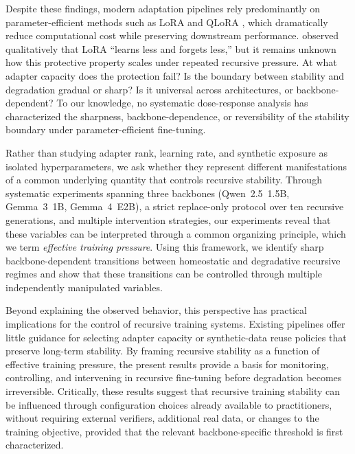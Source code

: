 \documentclass[a4paper,fleqn]{cas-dc}
\begin{document}
Despite these findings, modern adaptation pipelines rely predominantly on
parameter-efficient methods such as LoRA \citep{hu2022} and QLoRA
\citep{dettmers2023}, which dramatically reduce computational cost while
preserving downstream performance. \citet{biderman2024} observed qualitatively
that LoRA ``learns less and forgets less,'' but it remains unknown how this
protective property scales under repeated recursive pressure. At what adapter
capacity does the protection fail? Is the boundary between stability and
degradation gradual or sharp? Is it universal across architectures, or
backbone-dependent? To our knowledge, no systematic dose-response analysis has
characterized the sharpness, backbone-dependence, or reversibility of the
stability boundary under parameter-efficient fine-tuning.

Rather than studying adapter rank, learning rate, and synthetic exposure as
isolated hyperparameters, we ask whether they represent different manifestations
of a common underlying quantity that controls recursive stability. Through
systematic experiments spanning three backbones (Qwen~2.5~1.5B, Gemma~3~1B,
Gemma~4~E2B), a strict replace-only protocol over ten recursive generations, and
multiple intervention strategies, our experiments reveal that these variables can
be interpreted through a common organizing principle, which we term
\textit{effective training pressure}. Using this framework, we identify sharp
backbone-dependent transitions between homeostatic and degradative recursive
regimes and show that these transitions can be controlled through multiple
independently manipulated variables.

Beyond explaining the observed behavior, this perspective has practical
implications for the control of recursive training systems. Existing
pipelines offer little guidance for selecting adapter capacity or synthetic-data
reuse policies that preserve long-term stability. By framing recursive stability
as a function of effective training pressure, the present results provide a
basis for monitoring, controlling, and intervening in recursive fine-tuning
before degradation becomes irreversible. Critically, these results suggest that
recursive training stability can be influenced through configuration choices
already available to practitioners, without requiring external verifiers,
additional real data, or changes to the training objective, provided that the
relevant backbone-specific threshold is first characterized.
\end{document}
